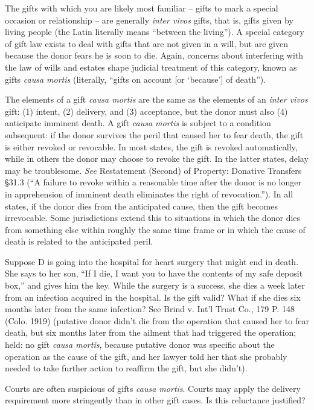 The gifts with which you are likely most familiar -- gifts to mark a special
occasion or relationship -- are generally \textit{inter vivos} gifts, that is,
gifts given by living people (the Latin literally means ``between the
living'').  A special category of gift law exists to deal with gifts that are
not given in a will, but are given because the donor fears he is soon to die. 
Again, concerns about interfering with the law of wills and estates shape
judicial treatment of this category, known as gifts \textit{causa mortis
}(literally, ``gifts on account [or `because'] of death'').

The elements of a gift \textit{causa mortis} are the same as the elements of an
\textit{inter vivos} gift: (1) intent, (2) delivery, and (3) acceptance, but
the donor must also (4) anticipate imminent death. A gift \textit{causa mortis}
is subject to a condition subsequent: if the donor survives the peril that
caused her to fear death, the gift is either revoked or revocable.  In most
states, the gift is revoked automatically, while in others the donor may choose
to revoke the gift.  In the latter states, delay may be troublesome. 
\textit{See }Restatement (Second) of Property: Donative Transfers {\S}31.3 (``A
failure to revoke within a reasonable time after the donor is no longer in
apprehension of imminent death eliminates the right of revocation.'').  In all
states, if the donor dies from the anticipated cause, then the gift becomes
irrevocable.  Some jurisdictions extend this to situations in which the donor
dies from something else within roughly the same time frame or in which the
cause of death is related to the anticipated peril.

Suppose D is going into the hospital for heart surgery that might end in death. 
She says to her son, ``If I die, I want you to have the contents of my safe
deposit box,'' and gives him the key.  While the surgery is a success, she dies
a week later from an infection acquired in the hospital.  Is the gift valid?
What if she dies six months later from the same infection?  See Brind v. Int'l
Trust Co., 179 P. 148 (Colo. 1919) (putative donor didn't die from the
operation that caused her to fear death, but six months later from the ailment
that had triggered the operation; held: no gift \textit{causa mortis}, because
putative donor was specific about the operation as the cause of the gift, and
her lawyer told her that she probably needed to take further action to reaffirm
the gift, but she didn't).  

Courts are often suspicious of gifts \textit{causa mortis}.  Courts may apply
the delivery requirement more stringently than in other gift cases.  Is this
reluctance justified? 

